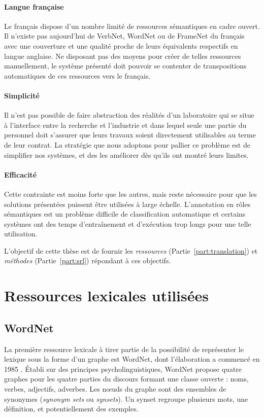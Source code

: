 \paragraph{Langue française} Le français dispose d'un nombre limité de
ressources sémantiques en cadre ouvert. Il n'existe pas aujourd'hui de VerbNet,
WordNet ou de FrameNet du français avec une couverture et une qualité proche de
leurs équivalents respectifs en langue anglaise. Ne disposant pas des moyens
pour créer de telles ressources manuellement, le système présenté doit pouvoir
se contenter de transpositions automatiques de ces ressources vers le français.

\paragraph{Simplicité} Il n'est pas possible de faire abstraction des réalités
d'un laboratoire qui se situe à l'interface entre la recherche et l'industrie
et dans lequel seule une partie du personnel doit s'assurer que leurs travaux
soient directement utilisables au terme de leur contrat. La stratégie que nous
adoptons pour pallier ce problème est de simplifier nos systèmes, et des les
améliorer dès qu'ils ont montré leurs limites.

\paragraph{Efficacité} Cette contrainte est moins forte que les autres, mais
reste nécessaire pour que les solutions présentées puissent être utilisées à
large échelle. L'annotation en rôles sémantiques est un problème difficile de
classification automatique et certains systèmes ont des temps d'entraînement et
d'exécution trop longs pour une telle utilisation.

L'objectif de cette thèse est de fournir les \emph{ressources}
(Partie~\ref{part:translation}) et \emph{méthodes} (Partie~\ref{part:srl})
répondant à ces objectifs.

\section{Ressources lexicales utilisées}

\subsection{WordNet}
\label{presentation_wordnet}

La première ressource lexicale à tirer partie de la possibilité de représenter
le lexique sous la forme d'un graphe est WordNet, dont l'élaboration a commencé
en 1985 \citep{miller1990introduction}. Établi sur des principes
psycholinguistiques, WordNet propose quatre graphes pour les quatre parties du
discours formant une classe ouverte : noms, verbes, adjectifs, adverbes. Les
nœuds du graphe sont des ensembles de synonymes (\emph{synonym sets} ou
\emph{synsets}). Un synset regroupe plusieurs mots, une définition, et
potentiellement des exemples.

